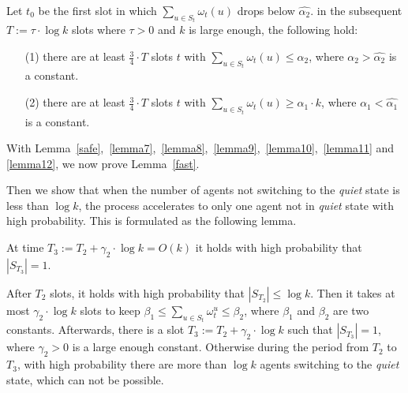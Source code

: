 \begin{lemma}
    \label{lemma12}
    Let $t_0$ be the first slot in which ${\sum}_{u\in S_t}\omega_t(u)$
    drops below $\hat{\alpha_2}$. in the subsequent $T :=\tau\cdot\log k$ slots
    where $\tau > 0$ and $k$ is large enough, the following hold:
    \begin{itemize}
        \item[(1)] there are at least $\frac{3}{4}\cdot T$ slots $t$
        with ${\sum}_{u\in S_t}\omega_t(u) \leq \alpha_2$, where $\alpha_2 > \hat{\alpha_2}$
        is a constant.
        \item[(2)] there are at least $\frac{3}{4}\cdot T$ slots $t$
        with ${\sum}_{u\in S_t}\omega_t(u) \geq \alpha_1\cdot k$, where $\alpha_1 < \hat{\alpha_1}$
        is a constant.
    \end{itemize}
\end{lemma}


With Lemma~\ref{safe},~\ref{lemma7},~\ref{lemma8},~\ref{lemma9},~\ref{lemma10},~\ref{lemma11} and
\ref{lemma12}, we now prove Lemma~\ref{fast}.


Then we show that when the number of agents not switching to 
the \emph{quiet} state is less than $\log k$, the process accelerates to 
only one agent not in \emph{quiet} state with high probability.
This is formulated as the following lemma.

\begin{lemma}
    \label{slow}
    At time $T_3 :=T_2 +\gamma_2 \cdot \log k = O(k)$ it holds with high
    probability that $|S_{T_3}| = 1$.
\end{lemma}
\begin{IEEEproof}
    After $T_2$ slots, it holds with high probability 
    that $|S_{T_2}| \leq \log k$. Then it takes at most $\gamma_2 \cdot \log k$
    slots to keep $\beta_1 \leq \sum_{u\in S_t} \omega_t^u \leq \beta_2$,
    where $\beta_1$ and $\beta_2$ are two constants.
    Afterwards, there is a slot $T_3 :=T_2 +\gamma_2\cdot\log k$ such that
    $|S_{T_3}| = 1$, where $\gamma_2 > 0$ is a large enough constant. 
    Otherwise during the period from $T_2$ to $T_3$,
    with high probability there are 
    more than $\log k$ agents switching to
    the \emph{quiet} state, which can not be possible.
\end{IEEEproof}

